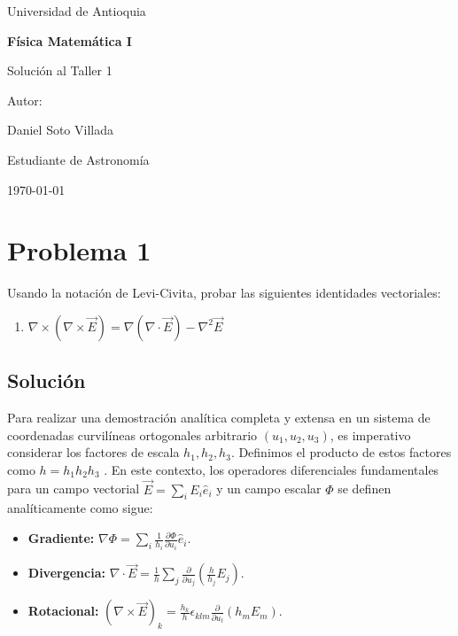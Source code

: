 \documentclass[a4paper]{article}
\begin{document}
\begin{titlepage}
  \centering
  {\Large Universidad de Antioquia\par}
  \vspace{2cm}
  {\huge\bfseries Física Matemática I\par}
  \vspace{0.4cm}
  {\Large Solución al Taller 1 \par}
  \vspace{2.5cm}
  {\large Autor:\par}
  \vspace{0.2cm}
  {\large Daniel Soto Villada\par}
  {\large Estudiante de Astronomía\par}
  \vfill
  {\large \today\par}
\end{titlepage}

\newpage
\tableofcontents
\newpage


\section{Problema 1}
Usando la notación de Levi-Civita, probar las siguientes identidades vectoriales:
\begin{enumerate}
    \item $\nabla \times (\nabla \times \vec{E}) = \nabla(\nabla \cdot \vec{E}) - \nabla^{2} \vec{E}$
\end{enumerate}

\subsection{Solución}

Para realizar una demostración analítica completa y extensa en un sistema de coordenadas curvilíneas ortogonales arbitrario $(u_1, u_2, u_3)$, es imperativo considerar los factores de escala $h_1, h_2, h_3$. Definimos el producto de estos factores como $h = h_1 h_2 h_3$ . En este contexto, los operadores diferenciales fundamentales para un campo vectorial $\vec{E} = \sum_i E_i \hat{e}_i$ y un campo escalar $\Phi$ se definen analíticamente como sigue:

\begin{itemize}
    \item \textbf{Gradiente:} $\nabla \Phi = \sum_i \frac{1}{h_i} \frac{\partial \Phi}{\partial u_i} \hat{e}_i$.
    \item \textbf{Divergencia:} $\nabla \cdot \vec{E} = \frac{1}{h} \sum_j \frac{\partial}{\partial u_j} \left( \frac{h}{h_j} E_j \right)$.
    \item \textbf{Rotacional:} $(\nabla \times \vec{E})_k = \frac{h_k}{h} \epsilon_{klm} \frac{\partial}{\partial u_l} (h_m E_m)$.
\end{itemize}
\end{document}

